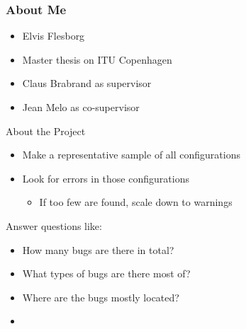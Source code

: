 \documentclass[mathserif,serif]{beamer}
\newenvironment{items}{
\begin{itemize}
  \setlength{\itemsep}{0pt}
  \setlength{\parskip}{7pt}
  \setlength{\parsep}{4pt}
}{\end{itemize}}
\begin{document}
\begin{frame}[t]
    \frametitle{About Me}

    \begin{items}
        \item Elvis Flesborg

        \item Master thesis on ITU Copenhagen
        \item Claus Brabrand as supervisor
        \item Jean Melo as co-supervisor
    \end{items}
\end{frame}

\begin{frame}[t]{About the Project}
    

    \begin{items}
        \item Make a representative sample of all configurations
        \item Look for errors in those configurations
        \begin{items}
            \item If too few are found, scale down to warnings
        \end{items}
    \end{items}

    
    Answer questions like:
    

    \begin{items}
        \item How many bugs are there in total?
        \item What types of bugs are there most of?
        \item Where are the bugs mostly located?
        \item \color{red}{... Any ideas?}
    \end{items}
\end{frame}
\end{document}

